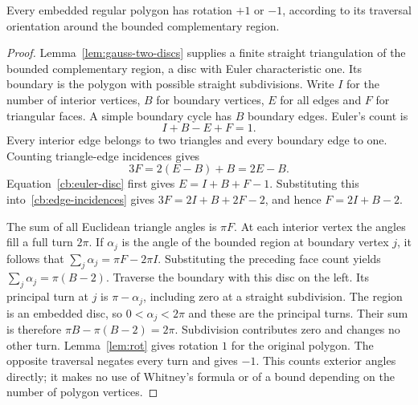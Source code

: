 \begin{lemma}
\label{cb:embedded-rotation}\leanok
Every embedded regular polygon has rotation $+1$ or $-1$, according
to its traversal orientation around the bounded complementary region.

\end{lemma}
\begin{proof}\leanok{}
Lemma~\ref{lem:gauss-two-discs} supplies a finite straight triangulation
of the bounded complementary region, a disc with Euler characteristic
one. Its boundary is the polygon with possible straight subdivisions.
Write $I$ for the number of interior vertices, $B$ for boundary vertices,
$E$ for all edges and $F$ for triangular faces. A simple boundary cycle
has $B$ boundary edges. Euler's count is
\begin{equation}\label{cb:euler-disc}
 I+B-E+F=1.
\end{equation}
Every interior edge belongs to two triangles and every boundary edge
to one. Counting triangle-edge incidences gives
\begin{equation}\label{cb:edge-incidences}
 3F=2(E-B)+B=2E-B.
\end{equation}
Equation~\eqref{cb:euler-disc} first gives $E=I+B+F-1$.
Substituting this into~\eqref{cb:edge-incidences} gives
$3F=2I+B+2F-2$, and hence $F=2I+B-2$.

The sum of all Euclidean triangle angles is $\pi F$. At each
interior vertex the angles fill a full turn $2\pi$. If $\alpha_j$
is the angle of the bounded region at boundary vertex $j$, it follows
that $\sum_j\alpha_j=\pi F-2\pi I$. Substituting the preceding face
count yields $\sum_j\alpha_j=\pi(B-2)$.
Traverse the boundary with this disc on the left. Its principal turn
at $j$ is $\pi-\alpha_j$, including zero at a straight subdivision.
The region is an embedded disc, so $0<\alpha_j<2\pi$ and these are
the principal turns. Their sum is therefore
$\pi B-\pi(B-2)=2\pi$. Subdivision contributes zero and changes no
other turn. Lemma~\ref{lem:rot} gives rotation $1$ for the original
polygon. The opposite traversal negates every turn and gives $-1$.
This counts exterior angles directly; it makes no use of Whitney's
formula or of a bound depending on the number of polygon vertices.
\end{proof}

